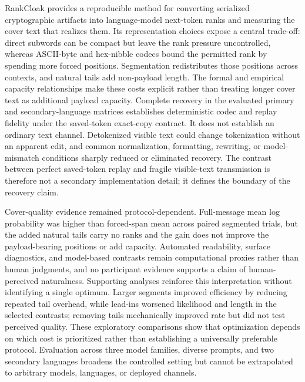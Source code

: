 \documentclass[fleqn,10pt]{wlscirep}
\begin{document}
RankCloak provides a reproducible method for converting serialized cryptographic artifacts into language-model next-token ranks and measuring the cover text that realizes them. Its representation choices expose a central trade-off: direct subwords can be compact but leave the rank pressure uncontrolled, whereas ASCII-byte and hex-nibble codecs bound the permitted rank by spending more forced positions. Segmentation redistributes those positions across contexts, and natural tails add non-payload length. The formal and empirical capacity relationships make these costs explicit rather than treating longer cover text as additional payload capacity.
Complete recovery in the evaluated primary and secondary-language matrices establishes deterministic codec and replay fidelity under the saved-token exact-copy contract. It does not establish an ordinary text channel. Detokenized visible text could change tokenization without an apparent edit, and common normalization, formatting, rewriting, or model-mismatch conditions sharply reduced or eliminated recovery. The contrast between perfect saved-token replay and fragile visible-text transmission is therefore not a secondary implementation detail; it defines the boundary of the recovery claim.

Cover-quality evidence remained protocol-dependent. Full-message mean log probability was higher than forced-span mean across paired segmented trials, but the added natural tails carry no ranks and the gain does not improve the payload-bearing positions or add capacity. Automated readability, surface diagnostics, and model-based contrasts remain computational proxies rather than human judgments, and no participant evidence supports a claim of human-perceived naturalness.
Supporting analyses reinforce this interpretation without identifying a single optimum. Larger segments improved efficiency by reducing repeated tail overhead, while lead-ins worsened likelihood and length in the selected contrasts; removing tails mechanically improved rate but did not test perceived quality. These exploratory comparisons show that optimization depends on which cost is prioritized rather than establishing a universally preferable protocol. Evaluation across three model families, diverse prompts, and two secondary languages broadens the controlled setting but cannot be extrapolated to arbitrary models, languages, or deployed channels.
\end{document}
